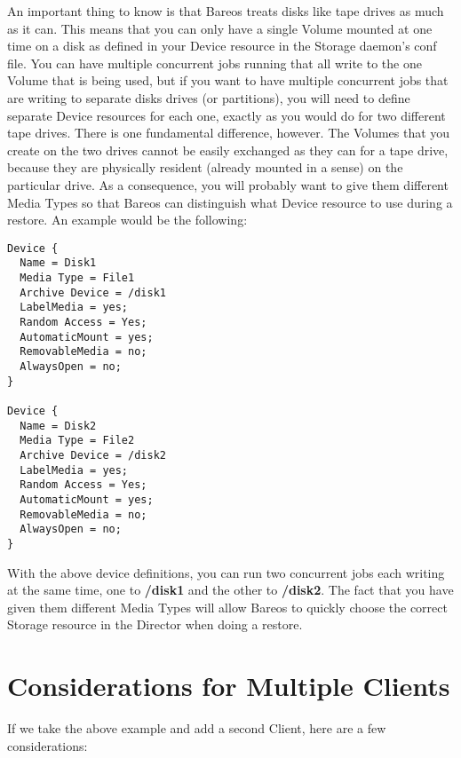 An important thing to know is that Bareos treats disks like tape drives
as much as it can. This means that you can only have a single Volume
mounted at one time on a disk as defined in your Device resource in
the Storage daemon's conf file.  You can have multiple concurrent
jobs running that all write to the one Volume that is being used, but
if you want to have multiple concurrent jobs that are writing to
separate disks drives (or partitions), you will need to define
separate Device resources for each one, exactly as you would do for
two different tape drives.  There is one fundamental difference, however.
The Volumes that you create on the two drives cannot be easily exchanged
as they can for a tape drive, because they are physically resident (already
mounted in a sense) on the particular drive.  As a consequence, you will
probably want to give them different Media Types so that Bareos can
distinguish what Device resource to use during a restore.
An example would be the following:

\footnotesize
\begin{verbatim}
Device {
  Name = Disk1
  Media Type = File1
  Archive Device = /disk1
  LabelMedia = yes;
  Random Access = Yes;
  AutomaticMount = yes;
  RemovableMedia = no;
  AlwaysOpen = no;
}

Device {
  Name = Disk2
  Media Type = File2
  Archive Device = /disk2
  LabelMedia = yes;
  Random Access = Yes;
  AutomaticMount = yes;
  RemovableMedia = no;
  AlwaysOpen = no;
}
\end{verbatim}
\normalsize

With the above device definitions, you can run two concurrent
jobs each writing at the same time, one to {\bf /disk1} and the
other to {\bf /disk2}.  The fact that you have given them different
Media Types will allow Bareos to quickly choose the correct
Storage resource in the Director when doing a restore.

\label{MultipleClients}
\section{Considerations for Multiple Clients}

If we take the above example and add a second Client, here are a few
considerations:

